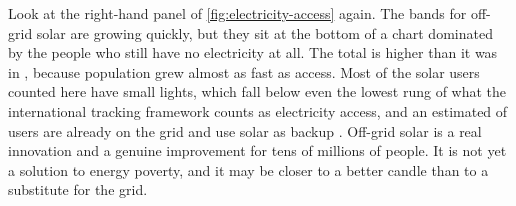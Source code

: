 \begin{counterpoint}
Look at the right-hand panel of \cref{fig:electricity-access} again. The bands
for off-grid solar are growing quickly, but they sit at the bottom of a chart
dominated by the \sspWithoutElec{} people who still have no electricity at all.
The total is higher than it was in \sspElecStartYear{}, because population grew
almost as fast as access. Most of the solar users counted here have small
lights, which fall below even the lowest rung of what the international
tracking framework counts as electricity access, and an estimated
\sdgOffgridBackupShare{} of users are already on the grid and use solar as
backup \parencite{esmap2026sdg7}. Off-grid solar is a real
innovation and a genuine improvement for tens of millions of people. It is not
yet a solution to energy poverty, and it may be closer to a better candle than
to a substitute for the grid.
\end{counterpoint}
